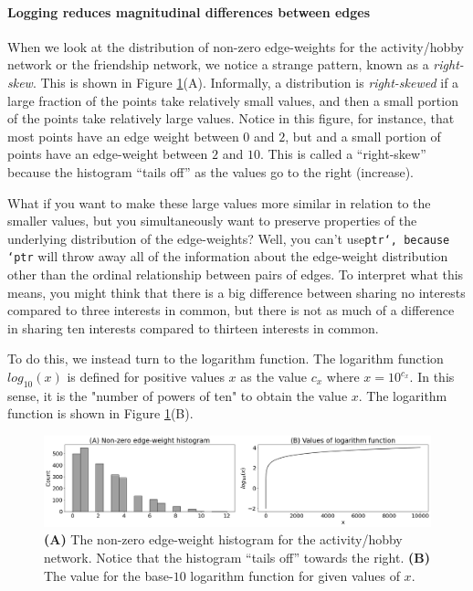 \paragraph{Logging reduces magnitudinal differences between edges}
\label{sec:ch4:regularization:logscale}

When we look at the distribution of non-zero edge-weights for the activity/hobby network or the friendship network, we notice a strange pattern, known as a \emph{right-skew}. This is shown in Figure \ref{fig:ch4:log}(A). Informally, a distribution is \emph{right-skewed} if a large fraction of the points take relatively small values, and then a small portion of the points take relatively large values. Notice in this figure, for instance, that most points have an edge weight between $0$ and $2$, but and a small portion of points have an edge-weight between $2$ and $10$. This is called a ``right-skew'' because the histogram ``tails off'' as the values go to the right (increase). 


What if you want to make these large values more similar in relation to the smaller values, but you simultaneously want to preserve properties of the underlying distribution of the edge-weights? Well, you can't use\texttt{ptr`, because `ptr} will throw away all of the information about the edge-weight distribution other than the ordinal relationship between pairs of edges. To interpret what this means, you might think that there is a big difference between sharing no interests compared to three interests in common, but there is not as much of a difference in sharing ten interests compared to thirteen interests in common.

To do this, we instead turn to the logarithm function. The logarithm function $log_{10}(x)$ is defined for positive values $x$ as the value $c_x$ where $x = 10^{c_x}$. In this sense, it is the "number of powers of ten" to obtain the value $x$. The logarithm function is shown in Figure \ref{fig:ch4:log}(B).

\begin{figure}
    \centering
    \includegraphics[width=\linewidth]{representations/ch4/Images/log.png}
    \caption[Heavy tailed edge-weights]{\textbf{(A)} The non-zero edge-weight histogram for the activity/hobby network. Notice that the histogram ``tails off'' towards the right. \textbf{(B)} The value for the base-$10$ logarithm function for given values of $x$.}
    \label{fig:ch4:log}
\end{figure}

